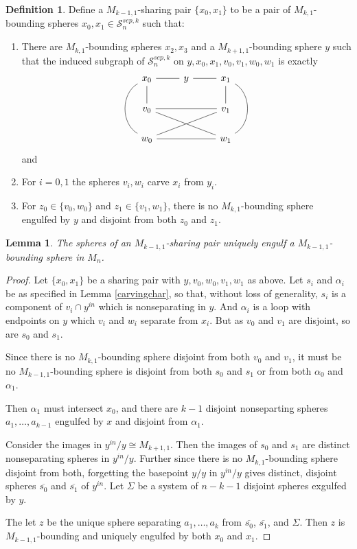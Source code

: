 \documentclass[11pt]{article}
\newtheorem{lemma}[theorem]{Lemma}
\theoremstyle{remark}
\theoremstyle{definition}
\newtheorem{definition}[theorem]{Definition}
\begin{document}
\begin{definition}
Define a $M_{k-1,1}$-sharing pair
 $\{x_0,x_1\}$
 to be a pair of $M_{k,1}$-bounding spheres $x_0,x_1 \in \mathcal S^{sep,k}_{n}$
such that:
\begin{enumerate}[(1)]
  \item
  There are $M_{k,1}$-bounding spheres $x_2,x_3$ and a
$M_{k+1,1}$-bounding sphere $y$
such that the induced subgraph of $\mathcal S^{sep,k}_{n}$
on $y,x_0,x_1,v_0,v_1,w_0,w_1$ is exactly
$$
\begin{tikzcd}[every arrow/.append style={dash}]
x_0 \arrow{d} \arrow{r} \arrow[bend right=60]{dd}& y \arrow{r}& x_1 \arrow{d} \arrow[bend left=60]{dd}\\
v_0 \arrow{rr} \arrow{rrd}&&  v_1\\
w_0 \arrow{rr} \arrow{rru} &&  w_1
\end{tikzcd}
$$
and
\item For $i=0,1$ the spheres $v_i,w_i$ carve $x_i$ from $y_i$.
\item For $z_0 \in \{v_0,w_0\}$ and $z_1 \in \{v_1,w_1\}$,
there is no $M_{k,1}$-bounding sphere engulfed by $y$ and disjoint from both
$z_0$ and $z_1$.
\end{enumerate}
\label{def:ksharepair}
\end{definition}


\begin{lemma}
  The spheres of an $M_{k-1,1}$-sharing pair
  uniquely engulf a
  $M_{k-1,1}$-bounding sphere in $M_n$.
\end{lemma}

\begin{proof}
Let $\{x_0,x_1\}$ be a sharing pair with $y,v_0,w_0,v_1,w_1$ as above.
Let $s_i$ and $\alpha_i$
be as specified in Lemma \ref{carvingchar},
so that,
without loss of generality,
$s_i$ is a component of $v_i \cap y^{in}$ which is nonseparating in $y$.
And $\alpha_i$ is a loop with endpoints on $y$ which $v_i$ and $w_i$ separate from $x_i$.
But as $v_0$ and $v_1$ are disjoint, so are $s_0$ and $s_1$.

Since there is no $M_{k,1}$-bounding sphere disjoint from
both $v_0$ and $v_1$, it must be no $M_{k-1,1}$-bounding sphere
is disjoint from both $s_0$ and $s_1$ or from both $\alpha_0$ and $\alpha_1$.

Then $\alpha_1$ must intersect $x_0$,
and there are $k-1$
disjoint nonseparting spheres $a_1,\ldots, a_{k-1}$
engulfed by $x$ and disjoint from $\alpha_1$.


Consider the images in $y^{in}/y \cong M_{k+1,1}$.
Then the images of $s_0$ and ${s_1}$
are distinct nonseparating spheres in $y^{in}/y$.
Further since there is no $M_{k,1}$-bounding sphere disjoint from
both, forgetting the basepoint $y/y$ in $y^{in}/y$
gives distinct, disjoint spheres
$\overline{s_0}$ and $\overline{s_1}$ of $y^{in}$.
Let $\Sigma$ be a system of $n-k-1$ disjoint spheres exgulfed by $y$.

The let $z$ be the unique sphere separating
$a_1,\ldots,a_k$ from $\overline{s_0}$, $\overline{s_1}$, and $\Sigma$.
Then $z$ is $M_{k-1,1}$-bounding and
uniquely engulfed by both $x_0$ and $x_1$.
\end{proof}
\end{document}
